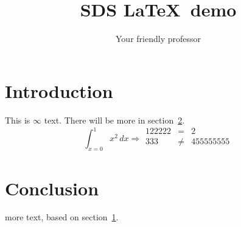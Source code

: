 \documentclass{article}
\begin{document}
\title{SDS \LaTeX\ demo}
\author{Your friendly professor}
\maketitle

\section{Introduction}
\label{sec:thefirst}

This is $\infty$ text. There will be more in
section~\ref{sec:thesecond}.
\[ \int_{x=0}^1 x^2\,dx
\Rightarrow
\begin{array}{rcl}
  122222 &= & 2 \\ 333 &\not=& 455555555 \\
\end{array}
\]

\section{Conclusion}
\label{sec:thesecond}

more text, based on section~\ref{sec:thefirst}.

%
%
\end{document}

